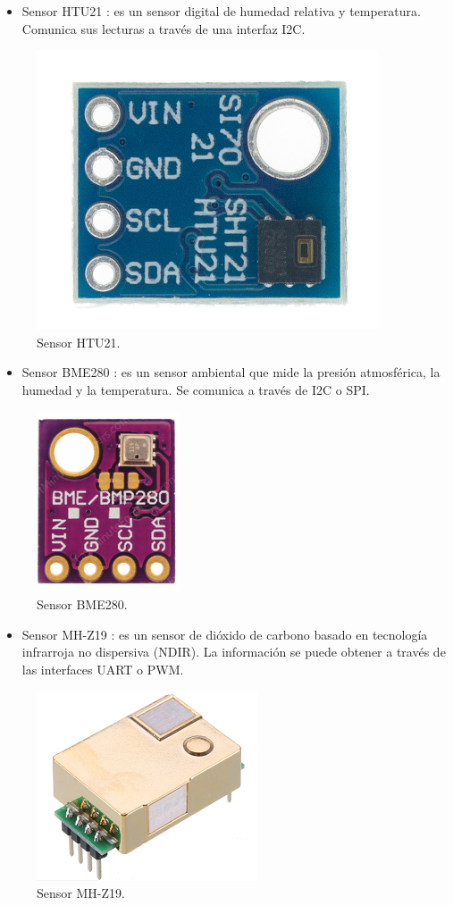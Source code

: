 \begin{itemize}
	\item Sensor HTU21 \citep{sensor_htu21}: es un sensor digital de humedad relativa y temperatura. Comunica sus lecturas a través de una interfaz I2C.
\end{itemize}

\begin{figure}[htpb]
    \centering
    \includegraphics[width=.2\textwidth]{./Figures/sensor_htu21.png}
    \caption{Sensor HTU21.}
    \label{fig:htu21}
\end{figure}

\begin{itemize}
	\item Sensor BME280 \citep{sensor_bme280}: es un sensor ambiental que mide la presión atmosférica, la humedad y la temperatura. Se comunica a través de I2C o SPI.
\end{itemize}

\begin{figure}[htpb]
    \centering
    \includegraphics[width=.2\textwidth]{./Figures/sensor_bme280.png}
    \caption{Sensor BME280.}
    \label{fig:bme280}
\end{figure}

\begin{itemize}
	\item Sensor MH-Z19 \citep{sensor_mhz19}: es un sensor de dióxido de carbono basado en tecnología infrarroja no dispersiva (NDIR). La información se puede obtener a través de las interfaces UART o PWM.
\end{itemize}

\begin{figure}[htpb]
    \centering
    \includegraphics[width=.2\textwidth]{./Figures/sensor_mhz19.png}
    \caption{Sensor MH-Z19.}
    \label{fig:mhz19}
\end{figure}


